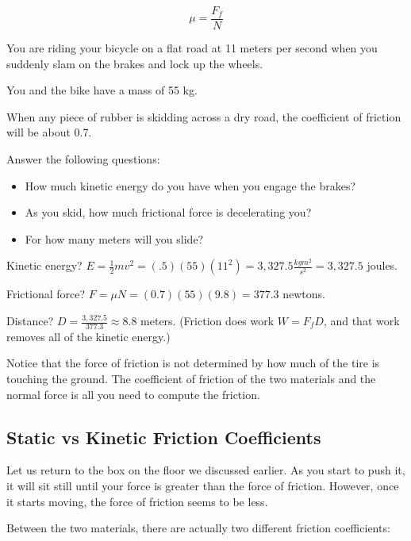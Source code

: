 $$\mu = \frac{F_{f}}{N}$$

\begin{Exercise}[title={Bicycle Stopping}, label=bike_stop]
 
You are riding your bicycle on a flat road at 11 meters per second when you suddenly slam on the brakes and lock up the wheels. 

You and the bike have a mass of 55 kg.  

When any piece of rubber is skidding across a dry road, the coefficient of friction will be about 0.7.

Answer the following questions: 

\begin{itemize}
\item How much kinetic energy do you have when you engage the brakes?
\item As you skid, how much frictional force is decelerating you?
\item For how many meters will you slide?
\end{itemize}

\end{Exercise}
\begin{Answer}[ref=bike_stop]

Kinetic energy? $E = \frac{1}{2}mv^2 = (.5)(55)(11^2) = 3,327.5 \frac{kg m^2}{s^2} = 3,327.5$ joules.

Frictional force? $F = \mu N = (0.7)(55)(9.8) = 377.3$ newtons.

Distance? $D = \frac{3,327.5}{377.3} \approx 8.8$ meters. (Friction does work $W = F_f D$, and that work removes all of the kinetic energy.)

\end{Answer}

Notice that the force of friction is not determined by how much of the tire is touching the ground. The coefficient of friction of the two materials and the normal force is all you need to compute the friction.
\subsection{Static vs Kinetic Friction Coefficients}

Let us return to the box on the floor we discussed earlier. As you start to push it, it will sit still until your force is greater than the force of friction.  However, once it starts moving, the force of friction seems to be less.

Between the two materials, there are actually two different friction coefficients:

